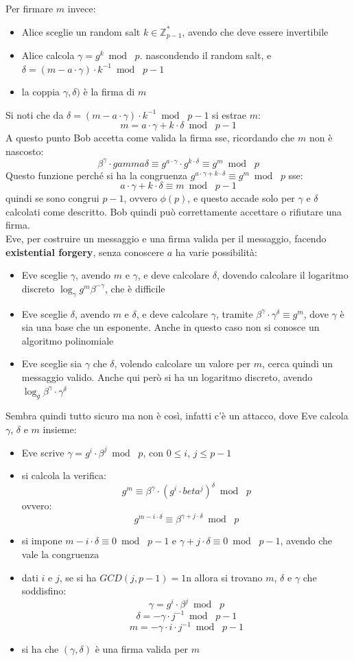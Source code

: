 \documentclass[a4paper,12pt, oneside]{book}
\begin{document}
Per firmare $m$ invece:
\begin{itemize}
  \item Alice sceglie un random salt $k\in\mathbb{Z}_{p-1}^*$, avendo che deve
  essere invertibile
  \item Alice calcola $\gamma=g^k\bmod\,\,p$. nascondendo il random salt, e
  $\delta=(m-a\cdot \gamma)\cdot k^{-1}\bmod \,\,p-1$
  \item la coppia $\gamma,\delta)$ è la firma di $m$
\end{itemize}
Si noti che da  $\delta=(m-a\cdot \gamma)\cdot k^{-1}\bmod \,\,p-1$ si estrae
$m$:
\[m=a\cdot \gamma+k\cdot \delta\bmod \,\,p-1\]
A questo punto Bob accetta come valida la firma sse, ricordando che $m$ non è
nascosto: 
\[\beta^\gamma\cdot gamma\delta\equiv g^{a\cdot \gamma}\cdot
  g^{k\cdot\delta}\equiv g^m\bmod\,\,p\]
Questo funzione perché si ha la congruenza $g^{a\cdot \gamma+k\cdot\delta}\equiv
g^m\bmod \,\,p$ sse: 
\[a\cdot \gamma+k\cdot \delta\equiv m\bmod\,\,p-1\]
quindi se sono congrui $p-1$, ovvero $\phi(p)$,
e questo accade solo per $\gamma$ e $\delta$ calcolati come descritto. Bob
quindi può correttamente accettare o rifiutare una firma.\\
Eve, per costruire un messaggio e una firma valida per il messaggio, facendo
\textbf{existential forgery}, senza conoscere $a$ ha varie possibilità:
\begin{itemize}
  \item Eve sceglie $\gamma$, avendo $m$ e $\gamma$, e deve calcolare $\delta$,
  dovendo calcolare il logaritmo discreto $\log_\gamma g^m\beta^{-\gamma}$, che
  è difficile
  \item Eve sceglie $\delta$, avendo $m$ e $\delta$, e deve calcolare $\gamma$,
  tramite $\beta^\gamma\cdot \gamma^\delta\equiv g^m$, dove $\gamma$ è sia una
  base che un esponente. Anche in questo caso non si conosce un algoritmo
  polinomiale
  \item Eve sceglie sia $\gamma$ che $\delta$, volendo calcolare un valore per
  $m$, cerca quindi un messaggio valido. Anche qui però si ha un logaritmo
  discreto, avendo $\log_g\beta^\gamma\cdot \gamma^\delta$
\end{itemize}
Sembra quindi tutto sicuro ma non è così, infatti c'è un attacco, dove Eve
calcola $\gamma$, $\delta$ e $m$ insieme: 
\begin{itemize}
  \item Eve scrive $\gamma=g^i\cdot \beta^j\bmod\,\,p$, con $0\leq i$, $j\leq
  p-1$ 
  \item si calcola la verifica:
  \[g^m\equiv \beta^\gamma\cdot (g^i\cdot beta^j)^\delta\bmod\,\,p\]
  ovvero:
  \[g^{m-i\cdot\delta}\equiv \beta^{\gamma+j\cdot \delta}\bmod\,\,p\]
  \item si impone $m-i\cdot \delta\equiv 0\bmod\,\,p-1$ e $\gamma+j\cdot
  \delta\equiv 0\bmod\,\,p-1$, avendo che vale la congruenza
  \item dati $i$ e $j$, se si ha $GCD(j,p-1)=1$n allora si trovano $m$, $\delta$
  e $\gamma$ che soddisfino:
  \[\gamma=g^i\cdot \beta^j\bmod\,\,p\]
  \[\delta=-\gamma\cdot j^{-1}\bmod\,\,p-1\]
  \[m=-\gamma\cdot i\cdot j^{-1}\bmod\,\,p-1\]
  \item si ha che $(\gamma,\delta)$ è una firma valida per $m$
\end{itemize}
\end{document}

